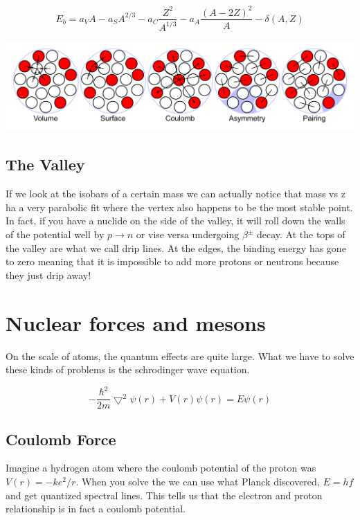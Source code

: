 \documentclass[english, 11pt]{article}
\begin{document}
\begin{defn}\label{ldm}
\[ E_b = a_V A-a_S A^{2/3} - a_C \frac{Z^2}{A^{1/3}} - a_A \frac{(A-2Z)^2}{A} - \delta(A,Z) \]
\end{defn}

\begin{center}\label{rus}
 \includegraphics[scale=0.23]{../img/liquid}
\end{center}

\subsection{The Valley}

If we look at the isobars of a certain mass we can actually notice that mass vs z ha a very parabolic fit where the vertex also happens to be the most stable point. In fact, if you have a nuclide on the side of the valley, it will roll down the walls of the potential well by $p \rightarrow n$ or vise versa undergoing $\beta^{\pm}$ decay. At the tops of the valley are what we call drip lines. At the edges, the binding energy has gone to zero meaning that it is impossible to add more protons or neutrons because they just drip away!

\section{Nuclear forces and mesons}

On the scale of atoms, the quantum effects are quite large. What we have to solve these kinds of problems is the schrodinger wave equation.

\begin{defn}\label{swe}
\[ -\frac{\hbar^2}{2m}\bigtriangledown^2\psi(r) + V(r)\psi(r) = E\psi(r) \]
\end{defn}

\subsection{Coulomb Force}

Imagine a hydrogen atom where the coulomb potential of the proton was $V(r) = -ke^2/r$. When you solve the  we can use what Planck discovered, $E=hf$ and get quantized spectral lines. This tells us that the electron and proton relationship is in fact a coulomb potential.
\end{document}
